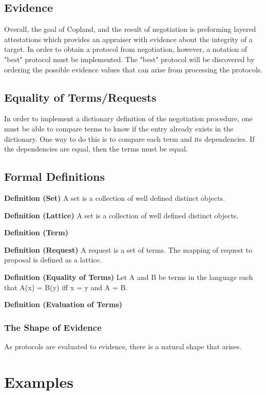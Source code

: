 \documentclass[10pt]{report}
\begin{document}
\section{Evidence}

Overall, the goal of Copland, and the result of negotiation is preforming
layered attestations which provides
an appraiser with evidence about the integrity of a target. In order to obtain
a protocol from negotiation, however, a notation of "best" protocol must
be implemented. The "best" protocol will be discovered by ordering the
possible evidence values that can arise from processing the protocols. 

\section{Equality of Terms/Requests}

In order to implement a dictionary definition of the negotiation procedure, 
one must be able to compare terms to know if the entry already exists
in the dictionary. One way to do this is to compare each term and its 
dependencies. If the dependencies are equal, then the terms must be equal. 


\section{Formal Definitions}

\textbf{Definition (Set)}
A set is a collection of well defined distinct objects.

\textbf{Definition (Lattice)}
A set is a collection of well defined distinct objects.



\textbf{Definition (Term)}

\textbf{Definition (Request)}
A request is a set of terms. The mapping of request to proposal is 
defined as a lattice. 

\textbf{Definition (Equality of Terms)}
Let A and B be terms in the language such that A(x) = B(y) iff x = y and A = B. 

\textbf{Definition (Evaluation of Terms)}

\subsection{The Shape of Evidence}

As protocols are evaluated to evidence, there is a natural shape that
arises.

\chapter{Examples}
\end{document}
